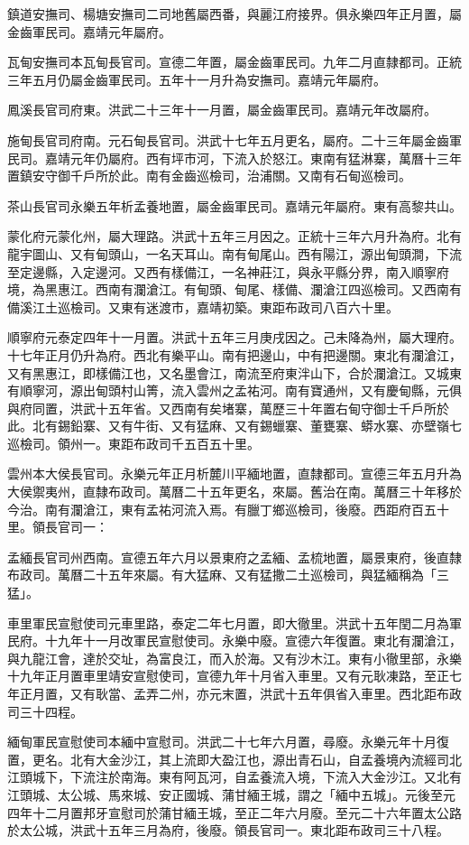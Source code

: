 鎮道安撫司、楊塘安撫司二司地舊屬西番，與麗江府接界。俱永樂四年正月置，屬金齒軍民司。嘉靖元年屬府。

瓦甸安撫司本瓦甸長官司。宣德二年置，屬金齒軍民司。九年二月直隸都司。正統三年五月仍屬金齒軍民司。五年十一月升為安撫司。嘉靖元年屬府。

鳳溪長官司府東。洪武二十三年十一月置，屬金齒軍民司。嘉靖元年改屬府。

施甸長官司府南。元石甸長官司。洪武十七年五月更名，屬府。二十三年屬金齒軍民司。嘉靖元年仍屬府。西有坪市河，下流入於怒江。東南有猛淋寨，萬曆十三年置鎮安守御千戶所於此。南有金齒巡檢司，治浦關。又南有石甸巡檢司。

茶山長官司永樂五年析孟養地置，屬金齒軍民司。嘉靖元年屬府。東有高黎共山。

蒙化府元蒙化州，屬大理路。洪武十五年三月因之。正統十三年六月升為府。北有龍宇圖山、又有甸頭山，一名天耳山。南有甸尾山。西有陽江，源出甸頭澗，下流至定邊縣，入定邊河。又西有樣備江，一名神莊江，與永平縣分界，南入順寧府境，為黑惠江。西南有瀾滄江。有甸頭、甸尾、樣備、瀾滄江四巡檢司。又西南有備溪江土巡檢司。又東有迷渡市，嘉靖初築。東距布政司八百六十里。

順寧府元泰定四年十一月置。洪武十五年三月庚戌因之。己未降為州，屬大理府。十七年正月仍升為府。西北有樂平山。南有把邊山，中有把邊關。東北有瀾滄江，又有黑惠江，即樣備江也，又名墨會江，南流至府東泮山下，合於瀾滄江。又城東有順寧河，源出甸頭村山箐，流入雲州之孟祐河。南有寶通州，又有慶甸縣，元俱與府同置，洪武十五年省。又西南有矣堵寨，萬歷三十年置右甸守御士千戶所於此。北有錫鉛寨、又有牛街、又有猛麻、又有錫蠟寨、董甕寨、蟒水寨、亦壁嶺七巡檢司。領州一。東距布政司千五百五十里。

雲州本大侯長官司。永樂元年正月析麓川平緬地置，直隸都司。宣德三年五月升為大侯禦夷州，直隸布政司。萬曆二十五年更名，來屬。舊治在南。萬曆三十年移於今治。南有瀾滄江，東有孟祐河流入焉。有臘丁鄉巡檢司，後廢。西距府百五十里。領長官司一：

孟緬長官司州西南。宣德五年六月以景東府之孟緬、孟梳地置，屬景東府，後直隸布政司。萬曆二十五年來屬。有大猛麻、又有猛撒二土巡檢司，與猛緬稱為「三猛」。

車里軍民宣慰使司元車里路，泰定二年七月置，即大徹里。洪武十五年閏二月為軍民府。十九年十一月改軍民宣慰使司。永樂中廢。宣德六年復置。東北有瀾滄江，與九龍江會，達於交址，為富良江，而入於海。又有沙木江。東有小徹里部，永樂十九年正月置車里靖安宣慰使司，宣德九年十月省入車里。又有元耿凍路，至正七年正月置，又有耿當、孟弄二州，亦元末置，洪武十五年俱省入車里。西北距布政司三十四程。

緬甸軍民宣慰使司本緬中宣慰司。洪武二十七年六月置，尋廢。永樂元年十月復置，更名。北有大金沙江，其上流即大盈江也，源出青石山，自孟養境內流經司北江頭城下，下流注於南海。東有阿瓦河，自孟養流入境，下流入大金沙江。又北有江頭城、太公城、馬來城、安正國城、蒲甘緬王城，謂之「緬中五城」。元後至元四年十二月置邦牙宣慰司於蒲甘緬王城，至正二年六月廢。至元二十六年置太公路於太公城，洪武十五年三月為府，後廢。領長官司一。東北距布政司三十八程。

